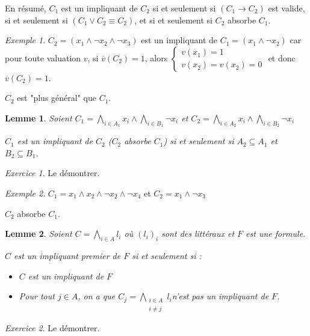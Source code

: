 \documentclass[]{article}
\newtheorem{mylemma}{Lemme}
\theoremstyle{remark}
\newtheorem{myexer}{Exercice}
\newtheorem{myexmpl}{Exemple}
\theoremstyle{definition}
\begin{document}
En résumé, $C_1$ est un impliquant de $C_2$ si et seulement si $(C_1 \rightarrow C_2)$ est valide, si et seulement si $(C_1 \lor C_2 \equiv C_2)$, et si et seulement si $C_2$ absorbe $C_1$.

\begin{myexmpl}
	$C_2 = (x_1 \land \neg x_2 \land \neg x_3)$ est un impliquant de $C_1=(x_1 \land \neg x_2)$ car pour toute valuation $v$, si $\overline{v}(C_2)=1$, alors 
	$\left\{
		\begin{array}{l}
			v(x_1)=1 \\
			v(x_2) = v(x_2)=0
		\end{array}
	\right.$ et donc $\overline{v}(C_2)=1$.
	
	$C_2$ est "plus général" que $C_1$.
\end{myexmpl}

\begin{mylemma}
	Soient $\displaystyle C_1 = \bigwedge_{i \in A_1} x_i \land \bigwedge_{i \in B_1} \neg x_i$ et $\displaystyle C_2 = \bigwedge_{i \in A_2} x_i \land \bigwedge_{i \in B_2} \neg x_i$
	
	$C_1$ est un impliquant de $C_2$ ($C_2$ absorbe $C_1$) si et seulement si $A_2 \subseteq A_1$ et $B_2 \subseteq B_1$.
\end{mylemma}

\begin{myexer}
	Le démontrer.
\end{myexer}

\begin{myexmpl}
	$C_1=x_1 \land x_2 \land\neg x_2\land \neg x_4$ et $C_2 = x_1 \land \neg x_3$
	
	$C_2$ absorbe $C_1$.
\end{myexmpl}

\begin{mylemma}
	Soient $\displaystyle C=\bigwedge_{i \in A} l_i$ où $(l_i)_i$ sont des littéraux et $F$ est une formule.
	
	$C$ est un impliquant premier de $F$ si et seulement si :
	\begin{itemize}
		\item $C$ est un impliquant de $F$
		\item Pour tout  $j \in A$, on a que $\displaystyle C_j = \bigwedge\limits_{\substack{i \in A \\ i \neq j}} l_i$n'est pas un impliquant de $F$.
	\end{itemize}
\end{mylemma}

\begin{myexer}
	Le démontrer.
\end{myexer}
\end{document}
